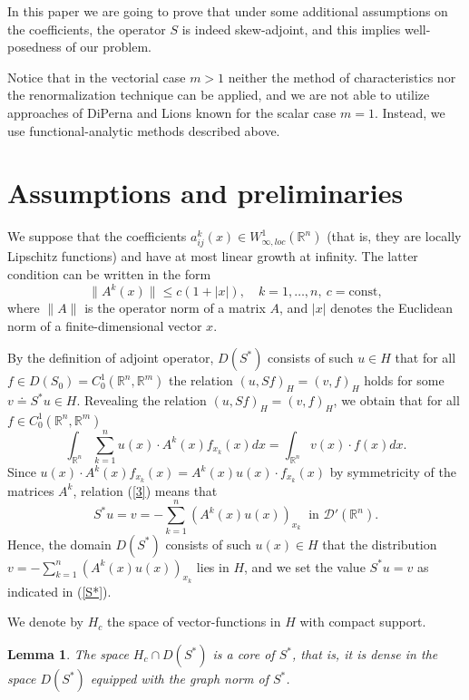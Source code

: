 \documentclass[12pt]{article}
\theoremstyle{plain}
\newtheorem{lemma}{Lemma}[section]
\theoremstyle{definition}
\numberwithin{equation}{section}
\newcommand{\R}{{\mathbb R}}
\newcommand{\D}{{\mathcal D}}
\newcommand{\const}{\mathrm{const}}
\begin{document}
In this paper we are going to prove that under some additional assumptions on the coefficients, the operator $S$ is indeed skew-adjoint, and this implies well-posedness of our problem.

Notice that in the vectorial case $m>1$ neither the method of characteristics nor the renormalization technique can be applied, and we are not able to utilize approaches of DiPerna and Lions \cite{DiL} known for the scalar case $m=1$. Instead, we use functional-analytic methods described above.

\section{Assumptions and preliminaries}\label{sec1}

We suppose that the coefficients $a^k_{ij}(x)\in W_{\infty,loc}^1(\R^n)$ (that is, they are locally Lipschitz functions) and have
at most linear growth at infinity. The latter condition can be written in the form
\begin{equation}\label{gr}
\|A^k(x)\|\le c(1+|x|), \quad k=1,\ldots,n, \ c=\const,
\end{equation}
where $\|A\|$ is the operator norm of a matrix $A$, and $|x|$ denotes the Euclidean norm of a finite-dimensional vector $x$.

By the definition of adjoint operator, $D(S^*)$ consists of such $u\in H$ that for all $f\in D(S_0)=C_0^1(\R^n,\R^m)$ the relation $(u,Sf)_H=(v,f)_H$ holds for some $v\doteq S^* u\in H$. Revealing the relation $(u,Sf)_H=(v,f)_H$, we obtain that
for all $f\in C_0^1(\R^n,\R^m)$
\begin{equation}\label{3}
\int_{\R^n} \sum_{k=1}^n u(x)\cdot A^k(x)f_{x_k}(x)dx=\int_{\R^n} v(x)\cdot f(x)dx.
\end{equation}
Since $u(x)\cdot A^k(x)f_{x_k}(x)=A^k(x)u(x)\cdot f_{x_k}(x)$ by symmetricity of the matrices $A^k$, relation (\ref{3}) means that
\begin{equation}\label{S*}
S^*u=v=-\sum_{k=1}^n (A^k(x)u(x))_{x_k} \ \mbox{ in } \D'(\R^n).
\end{equation}
Hence, the domain $D(S^*)$ consists of such $u(x)\in H$ that the distribution $\displaystyle v=-\sum_{k=1}^n (A^k(x)u(x))_{x_k}$ lies in $H$, and we set the value $S^*u=v$ as indicated in (\ref{S*}).

We denote by $H_c$ the space of vector-functions in $H$ with compact support.

\begin{lemma}\label{lem1}
The space $H_c\cap D(S^*)$ is a core of $S^*$, that is, it is dense in the space $D(S^*)$ equipped with the graph norm of $S^*$.
\end{lemma}
\end{document}
